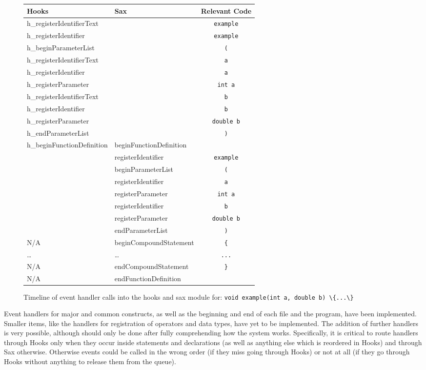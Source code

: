 \documentclass[12pt]{report}
\begin{document}
\begin{figure}
\begin{center}
\begin{tabular}{llc}
\toprule
Hooks & Sax  & Relevant Code\\
\midrule
h\_registerIdentifierText & & \lstinline!example! \\
h\_registerIdentifier & & \lstinline!example! \\
h\_beginParameterList & & \lstinline!(! \\
h\_registerIdentifierText & & \lstinline!a! \\
h\_registerIdentifier & & \lstinline!a! \\
h\_registerParameter & & \lstinline!int a! \\
h\_registerIdentifierText & & \lstinline!b! \\
h\_registerIdentifier & & \lstinline!b! \\
h\_registerParameter & & \lstinline!double b! \\
h\_endParameterList & & \lstinline!)! \\
h\_beginFunctionDefinition & beginFunctionDefinition & \\
 & registerIdentifier & \lstinline!example! \\
 & beginParameterList & \lstinline!(! \\
 & registerIdentifier & \lstinline!a! \\
 & registerParameter & \lstinline!int a! \\
 & registerIdentifier & \lstinline!b!\\
 & registerParameter & \lstinline!double b!\\
 & endParameterList & \lstinline!)!\\ \hdashline[1pt/4pt]
N/A & beginCompoundStatement & \lstinline!{!\\
\ldots & \ldots & \lstinline!...! \\
N/A & endCompoundStatement & \lstinline!}!\\
N/A & endFunctionDefinition \\
 \bottomrule
\end{tabular}
\end{center}
\caption[Timeline of Event Handler Calls]{Timeline of event handler calls into the hooks and sax module for: \lstinline!void example(int a, double b) \{...\}!}
\label{handlerTimeline}
\end{figure}

Event handlers for major and common constructs, as well as the beginning and end of each file and the 
program, have been implemented. Smaller items, like the handlers for registration of operators and data 
types, have yet to be implemented. The addition of further handlers is very possible, although should 
only be done after fully comprehending how the system works. Specifically, it is critical to route handlers 
through Hooks only when they occur inside statements and declarations (as well as anything else which 
is reordered in Hooks) and through Sax otherwise. Otherwise events could be called in the wrong order 
(if they miss going through Hooks) or not at all (if they go through Hooks without anything to release them 
from the queue).
\end{document}
